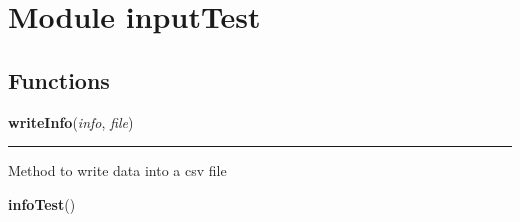 %
%
%


\section{Module inputTest}

    \label{inputTest}


  \subsection{Functions}

    \label{inputTest:writeInfo}

    \vspace{0.5ex}

\hspace{.8\funcindent}\begin{boxedminipage}{\funcwidth}

    \raggedright \textbf{writeInfo}(\textit{info}, \textit{file})

    \vspace{-1.5ex}

    \rule{\textwidth}{0.5\fboxrule}
\setlength{\parskip}{2ex}
    Method to write data into a csv file

\setlength{\parskip}{1ex}
    \end{boxedminipage}

    \label{inputTest:infoTest}

    \vspace{0.5ex}

\hspace{.8\funcindent}\begin{boxedminipage}{\funcwidth}

    \raggedright \textbf{infoTest}()

\setlength{\parskip}{2ex}
\setlength{\parskip}{1ex}
    \end{boxedminipage}


